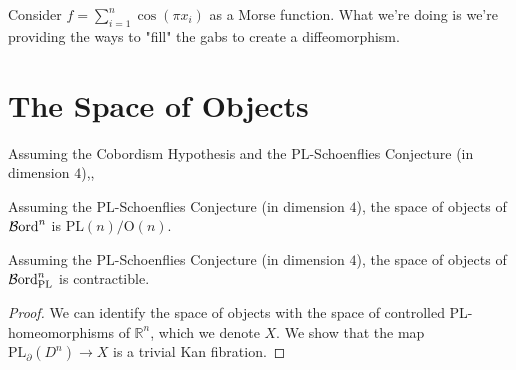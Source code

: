 \documentclass{article}
\newcommand{\PL}{\mathrm{PL}}
\renewcommand{\O}{\mathrm{O}}
\begin{document}
\begin{remark}[Wavelets]
    Consider $f = \sum_{i=1}^n \cos(\pi x_i)$ as a Morse function.
    What we're doing is we're providing the ways to "fill" the gabs to create a diffeomorphism.
\end{remark}

\section{The Space of Objects}

\begin{theorem}
    Assuming the Cobordism Hypothesis and the $\PL$-Schoenflies Conjecture (in dimension $4$),, 
\end{theorem}

\begin{lemma}
    Assuming the $\PL$-Schoenflies Conjecture (in dimension $4$), the space of objects of $\operatorname{\mathcal{B}ord}^n$ is $\PL(n)/\O(n)$.
\end{lemma}

\begin{lemma}
    Assuming the $\PL$-Schoenflies Conjecture (in dimension $4$), the space of objects of $\Bord^n_\PL$ is contractible.
\end{lemma}
\begin{proof}
    We can identify the space of objects with the space of controlled PL-homeomorphisms of $\mathbb{R}^n$, which we denote $X$.
    We show that the map $\PL_\partial(D^n) \to X$ is a trivial Kan fibration.
\end{proof}



\end{document}
